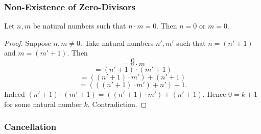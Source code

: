 \documentclass[10pt]{article}
\begin{document}
  \subsubsection*{Non-Existence of Zero-Divisors}

  \begin{forthel}
    \begin{proposition}[id=ARITHMETIC_06_3843962875936768,printid]
      Let $n, m$ be natural numbers such that $n \cdot m = 0$.
      Then $n = 0$ or $m = 0$.
    \end{proposition}
    \begin{proof}
      Suppose $n, m \neq 0$.
      Take natural numbers $n', m'$ such that $n = (n' + 1)$ and $m = (m' + 1)$.
      Then
      \[  0                                     \]
      \[    = n \cdot m                         \]
      \[    = (n' + 1) \cdot (m' + 1)           \]
      \[    = ((n' + 1) \cdot m') + (n' + 1)    \]
      \[    = (((n' + 1) \cdot m') + n') + 1.   \]
      Indeed $(n' + 1) \cdot (m' + 1) = ((n' + 1) \cdot m') + (n' + 1)$.
      Hence $0 = k + 1$ for some natural number $k$.
      Contradiction.
    \end{proof}
  \end{forthel}


  \subsubsection*{Cancellation}
\end{document}
